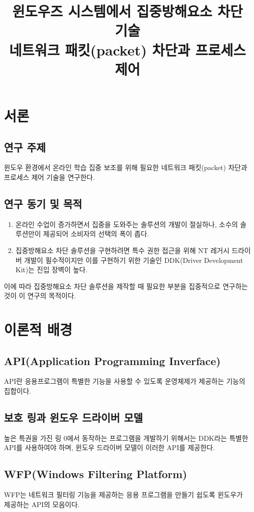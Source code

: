 \documentclass{tudelftposter}
\title{윈도우즈 시스템에서 집중방해요소 차단 기술\\
\large 네트워크 패킷(packet) 차단과 프로세스 제어}
\begin{document}
\section{서론}
\subsection{연구 주제}
윈도우 환경에서 온라인 학습 집중 보조를 위해 필요한 네트워크 패킷(packet) 차단과 프로세스 제어 기술을 연구한다.

\subsection{연구 동기 및 목적}
\begin{enumerate}
  \item 온라인 수업이 증가하면서 집중을 도와주는 솔루션의 개발이 절실하나, 소수의 솔루션만이 제공되어 소비자의 선택의 폭이 좁다.
  \item 집중방해요소 차단 솔루션을 구현하려면 특수 권한 접근을 위해 NT 레거시 드라이버 개발이 필수적이지만 이를 구현하기 위한 기술인 DDK(Driver Development Kit)는 진입 장벽이 높다.
\end{enumerate}
이에 따라 집중방해요소 차단 솔루션을 제작할 때 필요한 부분을 집중적으로 연구하는 것이 이 연구의 목적이다.

\section{이론적 배경}
\subsection{API(Application Programming Inverface)}
API란 응용프로그램이 특별한 기능을 사용할 수 있도록 운영체제가 제공하는 기능의 집합이다.
\subsection{보호 링과 윈도우 드라이버 모델}
높은 특권을 가진 링 0에서 동작하는 프로그램을 개발하기 위해서는 DDK라는 특별한 API를 사용하여야 하며, 윈도우 드라이버 모델이 이러한 API를 제공한다.

\subsection{WFP(Windows Filtering Platform)}
WFP는 네트워크 필터링 기능을 제공하는 응용 프로그램을 만들기 쉽도록 윈도우가 제공하는 API의 모음이다.
\end{document}
